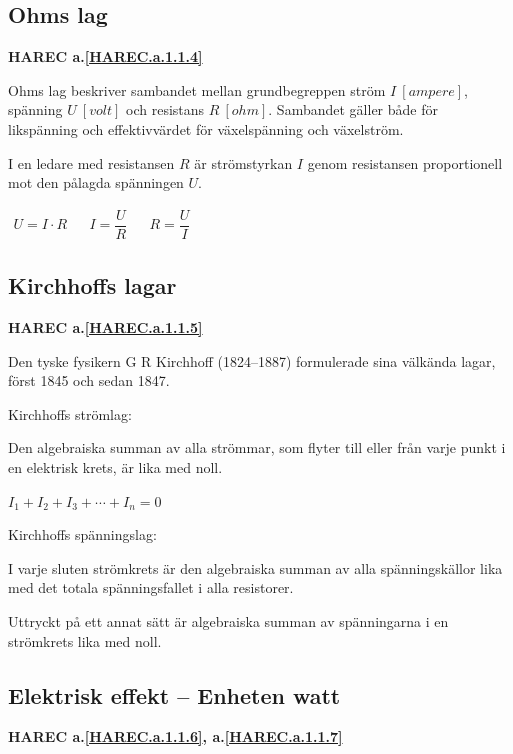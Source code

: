\subsection{Ohms lag}
\textbf{HAREC a.\ref{HAREC.a.1.1.4}\label{myHAREC.a.1.1.4}}

Ohms lag beskriver sambandet mellan grundbegreppen ström \(I\ [ampere]\),
spänning \(U\ [volt]\) och resistans \(R\ [ohm]\).
Sambandet gäller både för likspänning och effektivvärdet för växelspänning och
växelström.

I en ledare med resistansen \(R\) är strömstyrkan \(I\) genom resistansen
proportionell mot den pålagda spänningen \(U\).

\(
\begin{array}{lllll}U=I \cdot R & & I=\dfrac{U}{R} & & R=\dfrac{U}{I}\end{array}
\)

\subsection{Kirchhoffs lagar}
\textbf{HAREC a.\ref{HAREC.a.1.1.5}\label{myHAREC.a.1.1.5}}

Den tyske fysikern G R Kirchhoff (1824--1887) formulerade sina välkända lagar,
först 1845 och sedan 1847.

Kirchhoffs strömlag:

Den algebraiska summan av alla strömmar, som flyter till eller från varje punkt
i en elektrisk krets, är lika med noll.

\(I_1 + I_2 + I_3 + \cdots + I_n = 0\)

Kirchhoffs spänningslag:

I varje sluten strömkrets är den algebraiska summan av alla spänningskällor lika
med det totala spänningsfallet i alla resistorer.

Uttryckt på ett annat sätt är algebraiska summan av spänningarna i en
strömkrets lika med noll.

\subsection{Elektrisk effekt -- Enheten watt}
\textbf{HAREC a.\ref{HAREC.a.1.1.6}\label{myHAREC.a.1.1.6}, a.\ref{HAREC.a.1.1.7}\label{myHAREC.a.1.1.7}}

